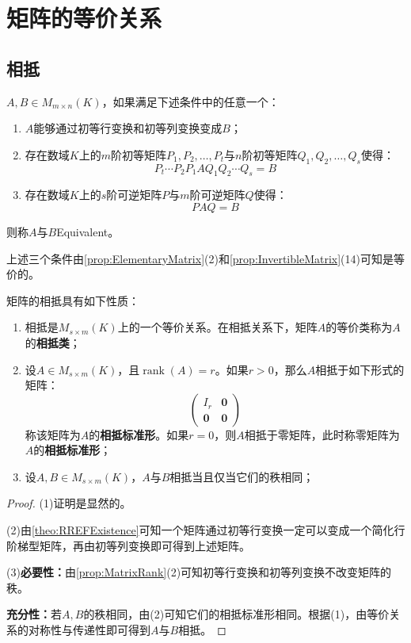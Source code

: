 \section{矩阵的等价关系}

\subsection{相抵}
\begin{definition}
	$A,B\in M_{m\times n}(K)$，如果满足下述条件中的任意一个：
	\begin{enumerate}
		\item $A$能够通过初等行变换和初等列变换变成$B$；
		\item 存在数域$K$上的$m$阶初等矩阵$P_1,P_2,\dots,P_t$与$n$阶初等矩阵$Q_1,Q_2,\dots,Q_s$使得：
		\begin{equation*}
			P_t\cdots P_2P_1AQ_1Q_2\cdots Q_s=B
		\end{equation*}
		\item 存在数域$K$上的$s$阶可逆矩阵$P$与$m$阶可逆矩阵$Q$使得：
		\begin{equation*}
			PAQ=B
		\end{equation*}
	\end{enumerate}
	则称$A$与$B$\gls{Equivalent}。
\end{definition}
上述三个条件由\cref{prop:ElementaryMatrix}(2)和\cref{prop:InvertibleMatrix}(14)可知是等价的。
\begin{property}\label{prop:EquivalentMatrix}
	矩阵的相抵具有如下性质：
	\begin{enumerate}
		\item 相抵是$M_{s\times m}(K)$上的一个等价关系。在相抵关系下，矩阵$A$的等价类称为$A$的\textbf{相抵类}；
		\item 设$A\in M_{s\times m}(K)$，且$\operatorname{rank}(A)=r$。如果$r>0$，那么$A$相抵于如下形式的矩阵：
		\begin{equation*}
			\begin{pmatrix}
				I_r & \mathbf{0} \\
				\mathbf{0} & \mathbf{0}
			\end{pmatrix}
		\end{equation*}
		称该矩阵为$A$的\textbf{相抵标准形}。如果$r=0$，则$A$相抵于零矩阵，此时称零矩阵为$A$的\textbf{相抵标准形}；
		\item 设$A,B\in M_{s\times m}(K)$，$A$与$B$相抵当且仅当它们的秩相同；
	\end{enumerate}
\end{property}
\begin{proof}
	(1)证明是显然的。\par
	(2)由\cref{theo:RREFExistence}可知一个矩阵通过初等行变换一定可以变成一个简化行阶梯型矩阵，再由初等列变换即可得到上述矩阵。\par
	(3)\textbf{必要性：}由\cref{prop:MatrixRank}(2)可知初等行变换和初等列变换不改变矩阵的秩。\par
	\textbf{充分性：}若$A,B$的秩相同，由(2)可知它们的相抵标准形相同。根据(1)，由等价关系的对称性与传递性即可得到$A$与$B$相抵。
\end{proof}

